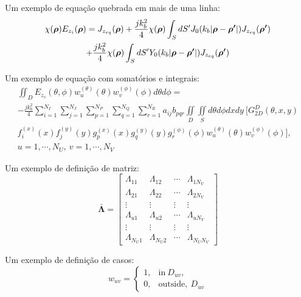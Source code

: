 		Um exemplo de equação quebrada em mais de uma linha:
		\begin{multline}
			\chi(\boldsymbol{\rho})E_{z_i}(\boldsymbol{\rho}) = J_{z_{eq}}(\boldsymbol{\rho}) + \frac{jk_b^2}{4} \chi(\boldsymbol{\rho}) \int_S dS^\prime J_0(k_b|\boldsymbol{\rho}-\boldsymbol{\rho^\prime}|) J_{z_{eq}}(\boldsymbol{\rho^\prime}) \\ + \frac{jk_b^2}{4} \chi(\boldsymbol{\rho}) \int_S dS^\prime Y_0(k_b|\boldsymbol{\rho}-\boldsymbol{\rho^\prime}|) J_{z_{eq}}(\boldsymbol{\rho^\prime})  \label{eq:2:2d:greendecomp:csie}
		\end{multline}

		Um exemplo de equação com somatórios e integrais:
		\begin{multline}
			\iint_D E_{z_s}(\theta,\phi) w^{(\theta)}_u(\theta) w^{(\phi)}_v(\phi) d\theta d\phi = \\ -\frac{jk_b^2}{4} \sum\limits_{i=1}^{N_I}\sum\limits_{j=1}^{N_J} \sum\limits_{p=1}^{N_P}\sum\limits_{q=1}^{N_Q}\sum\limits_{r=1}^{N_R} a_{ij} b_{pqr} \iint\limits_{D} \iint\limits_{S} d\theta d\phi dxdy~ \bigg[ G^D_{2D}(\theta,x,y) \\ f^{(x)}_i(x) f^{(y)}_j(y) g^{(x)}_{p}(x) g^{(y)}_{q}(y) g^{(\phi)}_r(\phi)w^{(\theta)}_u(\theta) w^{(\phi)}_v(\phi)  \bigg], \\ u = 1,\cdots, N_U,~ v = 1,\cdots,N_V \label{eq:3:discretization:6}
		\end{multline}

		Um exemplo de definição de matriz:
		\begin{equation}
			\boldsymbol{\bar{\Lambda}} = \begin{bmatrix}
																\Lambda_{11} & \Lambda_{12} & \cdots & \Lambda_{1N_V} \\
															   \Lambda_{21} & \Lambda_{22} & \cdots & \Lambda_{2N_V} \\
															   \vdots & \vdots & \vdots & \vdots \\
															   \Lambda_{u1} & \Lambda_{u2} & \cdots & \Lambda_{uN_V} \\
															   \vdots & \vdots & \vdots & \vdots \\
															   \Lambda_{N_U1} & \Lambda_{N_U2} & \cdots & \Lambda_{N_UN_V}
															  \end{bmatrix} \label{eq:discretization:9}
	   \end{equation}

	   Um exemplo de definição de casos:
	   \begin{equation}
		w_{uv} = \begin{cases}
						  1,& \mathrm{in} ~D_{uv}, \\
						  0,& \mathrm{outside}, ~D_{uv}
					  \end{cases} \label{eq:3:discretization:subdomain}
		\end{equation}

